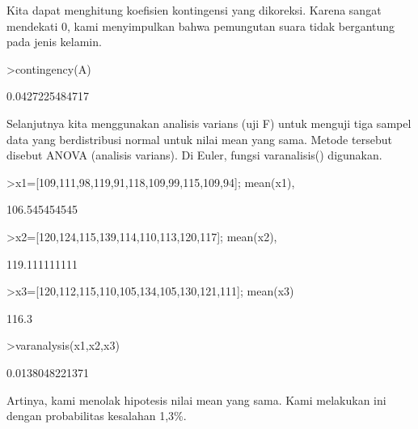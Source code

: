 \documentclass[a4paper,10pt]{article}
\begin{document}
\begin{eulernotebook}
\begin{eulercomment}
\begin{eulercomment}
\begin{eulercomment}
Kita dapat menghitung koefisien kontingensi yang dikoreksi. Karena
sangat mendekati 0, kami menyimpulkan bahwa pemungutan suara tidak
bergantung pada jenis kelamin.
\end{eulercomment}
\begin{eulerprompt}
>contingency(A)
\end{eulerprompt}
\begin{euleroutput}
  0.0427225484717
\end{euleroutput}
\begin{eulercomment}
Selanjutnya kita menggunakan analisis varians (uji F) untuk menguji
tiga sampel data yang berdistribusi normal untuk nilai mean yang sama.
Metode tersebut disebut ANOVA (analisis varians). Di Euler, fungsi
varanalisis() digunakan.
\end{eulercomment}
\begin{eulerprompt}
>x1=[109,111,98,119,91,118,109,99,115,109,94]; mean(x1),
\end{eulerprompt}
\begin{euleroutput}
  106.545454545
\end{euleroutput}
\begin{eulerprompt}
>x2=[120,124,115,139,114,110,113,120,117]; mean(x2),
\end{eulerprompt}
\begin{euleroutput}
  119.111111111
\end{euleroutput}
\begin{eulerprompt}
>x3=[120,112,115,110,105,134,105,130,121,111]; mean(x3)
\end{eulerprompt}
\begin{euleroutput}
  116.3
\end{euleroutput}
\begin{eulerprompt}
>varanalysis(x1,x2,x3)
\end{eulerprompt}
\begin{euleroutput}
  0.0138048221371
\end{euleroutput}
\begin{eulercomment}
Artinya, kami menolak hipotesis nilai mean yang sama. Kami melakukan
ini dengan probabilitas kesalahan 1,3\%.


\end{eulercomment}
\end{eulercomment}
\end{eulercomment}
\end{eulernotebook}
\end{document}
